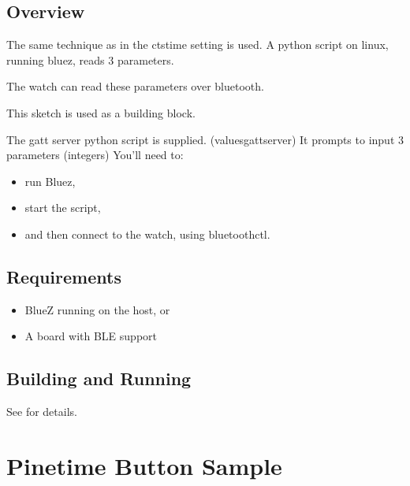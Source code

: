 \documentclass[letterpaper,10pt,english]{sphinxmanual}
\begin{document}
\subsection{Overview}
\label{\detokenize{samples/samplesbluetoothperipheralREADME:overview}}
The same technique as in the cts\sphinxhyphen{}time setting is used.
A python script on linux, running bluez, reads 3 parameters.

The watch can read these parameters over bluetooth.

This sketch is used as a building block.

The gatt server python script is supplied. (values\sphinxhyphen{}gatt\sphinxhyphen{}server)
It prompts to input 3 parameters (integers)
You’ll need to:
\begin{itemize}
\item {} 
run Bluez,

\item {} 
start the script,

\item {} 
and then connect to the watch, using bluetoothctl.

\end{itemize}


\subsection{Requirements}
\label{\detokenize{samples/samplesbluetoothperipheralREADME:requirements}}\begin{itemize}
\item {} 
BlueZ running on the host, or

\item {} 
A board with BLE support

\end{itemize}


\subsection{Building and Running}
\label{\detokenize{samples/samplesbluetoothperipheralREADME:building-and-running}}
See  for details.


\section{Pinetime  Button  Sample}
\label{\detokenize{samples/samplesbuttonpinebuttonREADME:pinetime-button-sample}}\label{\detokenize{samples/samplesbuttonpinebuttonREADME:pinebutton-sample}}\label{\detokenize{samples/samplesbuttonpinebuttonREADME::doc}}
\end{document}
